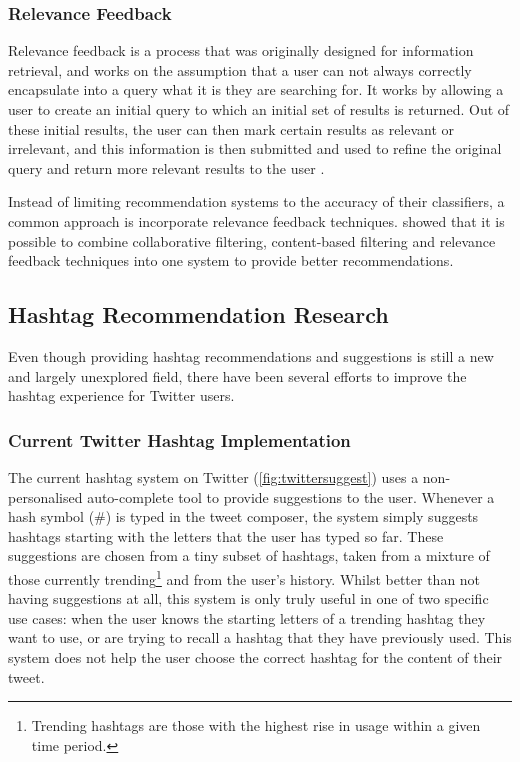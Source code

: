 \documentclass[12pt,a4paper]{article}
\begin{document}
\subsubsection{Relevance Feedback}
Relevance feedback is a process that was originally designed for information retrieval, and works on the assumption that a user can not always correctly encapsulate into a query what it is they are searching for. It works by allowing a user to create an initial query to which an initial set of results is returned. Out of these initial results, the user can then mark certain results as relevant or irrelevant, and this information is then submitted and used to refine the original query and return more relevant results to the user \parencite{Salton:1997}.

Instead of limiting recommendation systems to the accuracy of their classifiers, a common approach is incorporate relevance feedback techniques. \textcite{Utiyama:2006} showed that it is possible to combine collaborative filtering, content-based filtering and relevance feedback techniques into one system to provide better recommendations.

\subsection{Hashtag Recommendation Research}
Even though providing hashtag recommendations and suggestions is still a new and largely unexplored field, there have been several efforts to improve the hashtag experience for Twitter users.

\subsubsection{Current Twitter Hashtag Implementation}
The current hashtag system on Twitter (\autoref{fig:twittersuggest}) uses a non-personalised auto-complete tool to provide suggestions to the user. Whenever a hash symbol (\#) is typed in the tweet composer, the system simply suggests hashtags starting with the letters that the user has typed so far. These suggestions are chosen from a tiny subset of hashtags, taken from a mixture of those currently trending\footnote{Trending hashtags are those with the highest rise in usage within a given time period.} and from the user's history. Whilst better than not having suggestions at all, this system is only truly useful in one of two specific use cases: when the user knows the starting letters of a trending hashtag they want to use, or are trying to recall a hashtag that they have previously used. This system does not help the user choose the correct hashtag for the content of their tweet.
\end{document}
